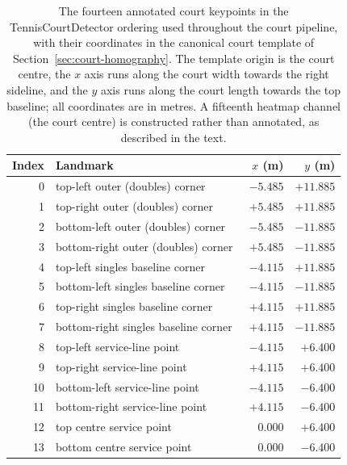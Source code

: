 \begin{table}[t]
  \centering
  \small
  \setlength{\tabcolsep}{6pt}
  \caption{The fourteen annotated court keypoints in the TennisCourtDetector
    ordering used throughout the court pipeline, with their coordinates in the
    canonical court template of Section~\ref{sec:court-homography}. The template
    origin is the court centre, the $x$ axis runs along the court width towards
    the right sideline, and the $y$ axis runs along the court length towards the
    top baseline; all coordinates are in metres. A fifteenth heatmap channel
    (the court centre) is constructed rather than annotated, as described in the
    text.}
  \label{tab:court-keypoints}
  \begin{tabular}{r l r r}
    \toprule
    Index & Landmark & $x$ (m) & $y$ (m) \\
    \midrule
    0  & top-left outer (doubles) corner       & $-5.485$ & $+11.885$ \\
    1  & top-right outer (doubles) corner      & $+5.485$ & $+11.885$ \\
    2  & bottom-left outer (doubles) corner    & $-5.485$ & $-11.885$ \\
    3  & bottom-right outer (doubles) corner   & $+5.485$ & $-11.885$ \\
    4  & top-left singles baseline corner      & $-4.115$ & $+11.885$ \\
    5  & bottom-left singles baseline corner   & $-4.115$ & $-11.885$ \\
    6  & top-right singles baseline corner     & $+4.115$ & $+11.885$ \\
    7  & bottom-right singles baseline corner  & $+4.115$ & $-11.885$ \\
    8  & top-left service-line point           & $-4.115$ & $+6.400$ \\
    9  & top-right service-line point          & $+4.115$ & $+6.400$ \\
    10 & bottom-left service-line point        & $-4.115$ & $-6.400$ \\
    11 & bottom-right service-line point       & $+4.115$ & $-6.400$ \\
    12 & top centre service point              & $\phantom{+}0.000$ & $+6.400$ \\
    13 & bottom centre service point           & $\phantom{+}0.000$ & $-6.400$ \\
    \bottomrule
  \end{tabular}
\end{table}

